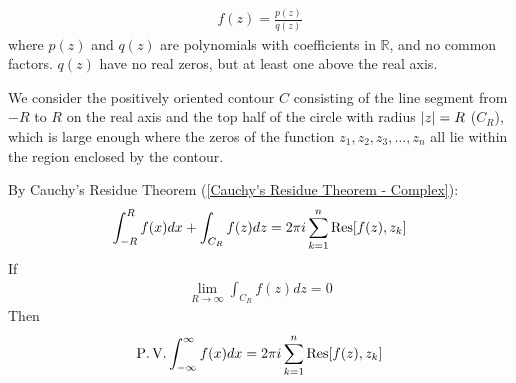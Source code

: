 \documentclass[12pt, english]{book}
\begin{document}
	
	\begin{definition}
		\label{Rational Function Definition - Complex}
		\begin{align*}
			f(z) = \frac{p(z)}{q(z)}
		\end{align*}
		where \(p(z)\) and \(q(z)\) are polynomials with coefficients in \(\mathbb{R}\), and no common factors. \(q(z)\) have no real zeros, but at least one above the real axis.
	\end{definition}

	We consider the positively oriented contour \(C\) consisting of the line segment from \(-R\) to \(R\) on the real axis and the top half of the circle with radius \(\abs{z} = R\) (\(C_R\)), which is large enough where the zeros of the function \(z_1, z_2, z_3, \ldots, z_n\) all lie within the region enclosed by the contour. 
	
	\begin{figure}[H]
		\centering
	\end{figure}
	
	By Cauchy's Residue Theorem (\cref{Cauchy's Residue Theorem - Complex}):
	\begin{align*}
		\int_{-R}^{R} f(x) dx + \int_{C_R} f(z) dz = 2\pi i \sum_{k=1}^{n} \Res[f(z), z_k]
	\end{align*}
	If 
	\begin{align*}
		\lim_{R\rightarrow \infty} \int_{C_R} f(z) dz = 0
	\end{align*}
	Then
	\begin{align*}
		\operatorname{P.V.} \int_{-\infty}^{\infty} f(x) dx = 2\pi i \sum_{k=1}^{n} \Res[f(z), z_k]
	\end{align*}
	
\end{document}
